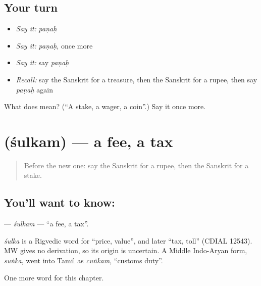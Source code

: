 \subsection*{Your turn}
\begin{itemize}
\raggedright
  \item \emph{Say it:} \emph{paṇaḥ}
  \item \emph{Say it:} \emph{paṇaḥ}, once more
  \item \emph{Say it:} say \emph{paṇaḥ}
  \item \emph{Recall:} say the Sanskrit for a treasure, then the Sanskrit for a rupee, then say \emph{paṇaḥ} again
\end{itemize}

\begin{tcolorbox}[breakable,colback=teal!4,colframe=teal!35!black,title={Before you move on}]
What does  mean? (\textquotedblleft{}A stake, a wager, a coin\textquotedblright{}.) Say it once more.
\end{tcolorbox}
\section[\texorpdfstring{\sk{शुल्कम्} (śulkam)}{शुल्कम् (śulkam)}]{ (śulkam) — a fee, a tax}

\label{lesson:SA-C248-sulkam}



\begin{quote}
Before the new one: say the Sanskrit for a rupee, then the Sanskrit for a stake.
\end{quote}

\subsection*{You'll want to know: }
\textbf{} — \emph{śulkam} — \textquotedblleft{}a fee, a tax\textquotedblright{}.

\begin{cousinweb}
\emph{śulka} is a Rigvedic word for \textquotedblleft{}price, value\textquotedblright{}, and later \textquotedblleft{}tax, toll\textquotedblright{} (CDIAL 12543). MW gives no derivation, so its origin is uncertain. A Middle Indo-Aryan form, \emph{suṅka}, went into Tamil as \emph{cuṅkam}, \textquotedblleft{}customs duty\textquotedblright{}.
\end{cousinweb}

\begin{grammarlens}[title={What you've built}]
One more word for this chapter.
\end{grammarlens}

